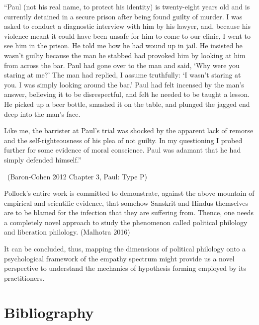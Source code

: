 \begin{myquote}
“Paul (not his real name, to protect his identity) is twenty-eight years old and is currently detained in a secure prison after being found guilty of murder. I was asked to conduct a diagnostic interview with him by his lawyer, and, because his violence meant it could have been unsafe for him to come to our clinic, I went to see him in the prison. He told me how he had wound up in jail. He insisted he wasn’t guilty because the man he stabbed had provoked him by looking at him from across the bar. Paul had gone over to the man and said, ‘Why were you staring at me?’ The man had replied, I assume truthfully: ‘I wasn’t staring at you. I was simply looking around the bar.’ Paul had felt incensed by the man’s answer, believing it to be disrespectful, and felt he needed to be taught a lesson. He picked up a beer bottle, smashed it on the table, and plunged the jagged end deep into the man’s face.
\end{myquote}

\begin{myquote}
Like me, the barrister at Paul’s trial was shocked by the apparent lack of remorse and the self-righteousness of his plea of not guilty. In my questioning I probed further for some evidence of moral conscience. Paul was adamant that he had simply defended himself.” 

~\hfill (Baron-Cohen 2012 Chapter 3, Paul: Type P)
\end{myquote}

Pollock's entire work is committed to demonstrate, against the above mountain of empirical and scientific evidence, that somehow Sanskrit and Hindus themselves are to be blamed for the infection that they are suffering from. Thence, one needs a completely novel approach to study the phenomenon called political philology and liberation philology. (Malhotra 2016)

It can be concluded, thus, mapping the dimensions of political philology onto a psychological framework of the empathy spectrum might provide us a novel perspective to understand the mechanics of hypothesis forming employed by its practitioners.


\section*{Bibliography}

